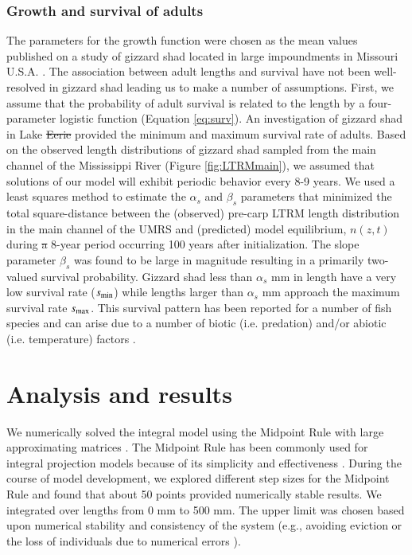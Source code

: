 \documentclass[preprint,review,12pt,authoryear]{elsarticle}
\def\ds{\displaystyle}
\providecommand{\DIFaddtex}[1]{{\protect\color{blue}\uwave{#1}}} %
\providecommand{\DIFdeltex}[1]{{\protect\color{red}\sout{#1}}}                      %
\providecommand{\DIFaddbegin}{} %
\providecommand{\DIFaddend}{} %
\providecommand{\DIFdelbegin}{} %
\providecommand{\DIFdelend}{} %
\providecommand{\DIFadd}[1]{\texorpdfstring{\DIFaddtex{#1}}{#1}} %
\providecommand{\DIFdel}[1]{\texorpdfstring{\DIFdeltex{#1}}{}} %
\begin{document}
\subsubsection{Growth and survival of adults}
The parameters for the growth function were chosen as the mean values published on a study of gizzard shad located in large impoundments in Missouri U.S.A. \citep{michaletz2017variation}. 
The association between adult lengths and survival have not been well-resolved in gizzard shad leading us to make a number of assumptions.  
First, we assume that the probability of adult survival is related to the length by a four-parameter logistic function (Equation \ref{eq:surv}).
An investigation of gizzard shad in Lake \DIFdelbegin \DIFdel{Eerie }\DIFdelend \DIFaddbegin \DIFadd{Erie }\DIFaddend \citep{bodola1955life} provided the minimum and maximum survival rate of adults. 
Based on the observed length distributions of gizzard shad sampled from the main channel of the Mississippi River (Figure \ref{fig:LTRMmain}), we assumed that solutions of our model will exhibit periodic behavior every 8-9 years.   
We used a least squares method to estimate the $\alpha_s$ and $\beta_s$ parameters that 
minimized the total square-distance between the (observed) pre-carp LTRM length distribution in the main channel of the UMRS and (predicted) model equilibrium, $n(z,t)$ during \DIFdelbegin \DIFdel{a }\DIFdelend \DIFaddbegin \DIFadd{an }\DIFaddend 8-year period occurring 100 years after initialization.  
The slope parameter $\beta_s$ was found to be large in magnitude resulting in a primarily two-valued survival probability.  
Gizzard shad less than $\alpha_s$ mm in length have a very low survival rate ($\ds s_{\rm {min}}$) while lengths larger than  $\alpha_s$ mm approach the maximum survival rate $\ds s_{\rm {max}}$. 
This survival pattern has been reported for a number of fish species and can arise due to a number of biotic (i.e. predation) and/or abiotic (i.e. temperature) factors \citep{pepin1992significance, nowlin2006gape}. 
\DIFaddbegin 

\DIFaddend \section{Analysis and results} \DIFaddbegin \label{sec:analysis}
\DIFaddend We numerically solved the integral model using the Midpoint Rule with large approximating matrices \citep{burden2005numerical}. 
The Midpoint Rule has been commonly used for integral projection models because of its simplicity and effectiveness \citep{ellner2006integral, ramula2009integral,  merow2014advancing}. 
During the course of model development, we explored different step sizes for the Midpoint Rule and found that about 50 points provided numerically stable results. 
We integrated over lengths from 0 mm to 500 mm. 
The upper limit was chosen based upon numerical stability and consistency of the system (e.g., avoiding eviction or the loss of individuals due to numerical errors \citep{williams2012avoiding}). 
\end{document}
